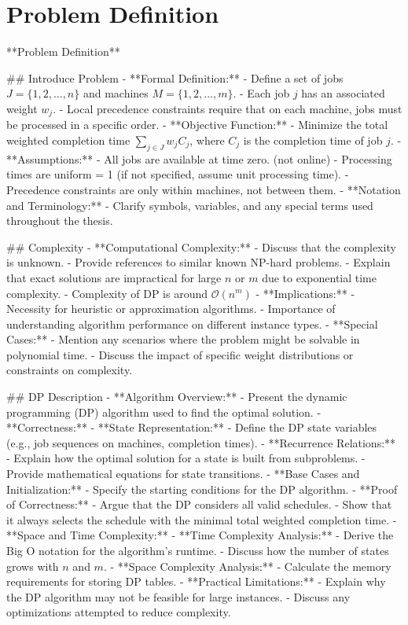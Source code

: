 \chapter{Problem Definition}
**Problem Definition**

\begin{markdown}
    ## Introduce Problem
    - **Formal Definition:**
    - Define a set of jobs $J = \{1, 2, ..., n\}$ and machines $M = \{1, 2, ..., m\}$.
    - Each job $j$ has an associated weight $w_j$.
    - Local precedence constraints require that on each machine, jobs must be processed in a
    specific order.
    - **Objective Function:**
    - Minimize the total weighted completion time $\sum_{j \in J} w_j C_j$, where $C_j$ is the
    completion time of job $j$.
    - **Assumptions:**
    - All jobs are available at time zero. (not online)
    - Processing times are uniform = 1 (if not specified, assume unit processing time).
    - Precedence constraints are only within machines, not between them.
    - **Notation and Terminology:**
    - Clarify symbols, variables, and any special terms used throughout the thesis.

    ## Complexity
    - **Computational Complexity:**
    - Discuss that the complexity is unknown.
    - Provide references to similar known NP-hard problems.
    - Explain that exact solutions are impractical for large $n$ or $m$ due to exponential time
    complexity.
    - Complexity of DP is around $\mathcal{O}(n^m)$
    - **Implications:**
    - Necessity for heuristic or approximation algorithms.
    - Importance of understanding algorithm performance on different instance types.
    - **Special Cases:**
    - Mention any scenarios where the problem might be solvable in polynomial time.
    - Discuss the impact of specific weight distributions or constraints on complexity.

    ## DP Description
    - **Algorithm Overview:**
    - Present the dynamic programming (DP) algorithm used to find the optimal solution.
    - **Correctness:**
    - **State Representation:**
    - Define the DP state variables (e.g., job sequences on machines, completion times).
    - **Recurrence Relations:**
    - Explain how the optimal solution for a state is built from subproblems.
    - Provide mathematical equations for state transitions.
    - **Base Cases and Initialization:**
    - Specify the starting conditions for the DP algorithm.
    - **Proof of Correctness:**
    - Argue that the DP considers all valid schedules.
    - Show that it always selects the schedule with the minimal total weighted completion
    time.
    - **Space and Time Complexity:**
    - **Time Complexity Analysis:**
    - Derive the Big O notation for the algorithm's runtime.
    - Discuss how the number of states grows with $n$ and $m$.
    - **Space Complexity Analysis:**
    - Calculate the memory requirements for storing DP tables.
    - **Practical Limitations:**
    - Explain why the DP algorithm may not be feasible for large instances.
    - Discuss any optimizations attempted to reduce complexity.
\end{markdown}


